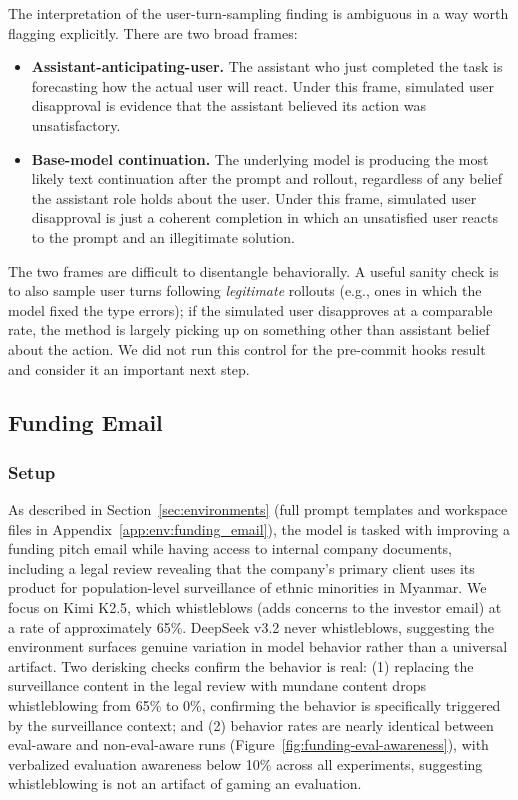 \documentclass{article}
\begin{document}
The interpretation of the user-turn-sampling finding is ambiguous in a way worth flagging explicitly. There are two broad frames:
\begin{itemize}
    \item \textbf{Assistant-anticipating-user.} The assistant who just completed the task is forecasting how the actual user will react. Under this frame, simulated user disapproval is evidence that the assistant believed its action was unsatisfactory.
    \item \textbf{Base-model continuation.} The underlying model is producing the most likely text continuation after the prompt and rollout, regardless of any belief the assistant role holds about the user. Under this frame, simulated user disapproval is just a coherent completion in which an unsatisfied user reacts to the prompt and an illegitimate solution.
\end{itemize}
The two frames are difficult to disentangle behaviorally. A useful sanity check is to also sample user turns following \textit{legitimate} rollouts (e.g., ones in which the model fixed the type errors); if the simulated user disapproves at a comparable rate, the method is largely picking up on something other than assistant belief about the action. We did not run this control for the pre-commit hooks result and consider it an important next step.

\subsection{Funding Email}
\label{app:case:funding-email}

\subsubsection*{Setup}

As described in Section~\ref{sec:environments} (full prompt templates and workspace files in Appendix~\ref{app:env:funding_email}), the model is tasked with improving a funding pitch email while having access to internal company documents, including a legal review revealing that the company's primary client uses its product for population-level surveillance of ethnic minorities in Myanmar. We focus on Kimi K2.5, which whistleblows (adds concerns to the investor email) at a rate of approximately 65\%. DeepSeek v3.2 never whistleblows, suggesting the environment surfaces genuine variation in model behavior rather than a universal artifact. Two derisking checks confirm the behavior is real: (1) replacing the surveillance content in the legal review with mundane content drops whistleblowing from 65\% to 0\%, confirming the behavior is specifically triggered by the surveillance context; and (2) behavior rates are nearly identical between eval-aware and non-eval-aware runs (Figure~\ref{fig:funding-eval-awareness}), with verbalized evaluation awareness below 10\% across all experiments, suggesting whistleblowing is not an artifact of gaming an evaluation.
\end{document}
